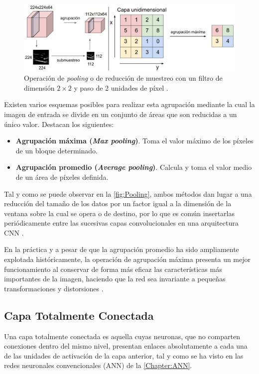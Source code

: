 \begin{figure}
    \centering
    \includegraphics[width=\textwidth]{Images/Pooling.png}
    \caption{Operación de \textit{pooling} o de reducción de muestreo con un filtro de dimensión $2\times 2$ y paso de 2 unidades de píxel \cite{CS231n}.}
    \label{fig:Pooling}
\end{figure}

Existen varios esquemas posibles para realizar esta agrupación mediante la cual la imagen de entrada se divide en un conjunto de áreas que son reducidas a un único valor. Destacan los siguientes:
\begin{itemize}
  \item \textbf{Agrupación máxima (\textit{Max pooling})}. Toma el valor máximo de los píxeles de un bloque determinado.
  \item \textbf{Agrupación promedio (\textit{Average pooling})}. Calcula y toma el valor medio de un área de píxeles definida.
\end{itemize}

Tal y como se puede observar en la \autoref{fig:Pooling}, ambos métodos dan lugar a una reducción del tamaño de los datos por un factor igual a la dimensión de la ventana sobre la cual se opera o de destino, por lo que es común insertarlas periódicamente entre las sucesivas capas convolucionales en una arquitectura CNN \cite{CS231n}.

En la práctica y a pesar de que la agrupación promedio ha sido ampliamente explotada históricamente, la operación de agrupación máxima presenta un mejor funcionamiento al conservar de forma más eficaz las características más importantes de la imagen, haciendo que la red sea invariante a pequeñas transformaciones y distorsiones \cite{Pooling}.

\subsection{Capa Totalmente Conectada}

Una capa totalmente conectada es aquella cuyas neuronas, que no comparten conexiones dentro del mismo nivel, presentan enlaces absolutamente a cada una de las unidades de activación de la capa anterior, tal y como se ha visto en las redes neuronales convencionales (ANN) de la \autoref{Chapter:ANN}.

